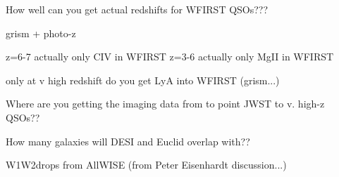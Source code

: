 

How well can you get actual redshifts for WFIRST QSOs???

grism + photo-z 

z=6-7  actually only CIV in WFIRST 
z=3-6 actually only MgII in WFIRST 

only at v high redshift do you get LyA into WFIRST (grism...)



Where are you getting the imaging data from to point
JWST to v. high-z QSOs??


How many galaxies will DESI and Euclid overlap with??


W1W2drops from AllWISE (from Peter Eisenhardt discussion...)
 